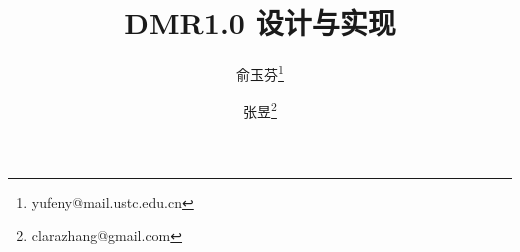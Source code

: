 \documentclass[a4paper,11pt,titlepage]{article}
\begin{document}
\title{DMR1.0 设计与实现} 
\author{俞玉芬\thanks{yufeny@mail.ustc.edu.cn}}
\author{张昱\thanks{clarazhang@gmail.com}}


\maketitle
\tableofcontents
\setcounter{tocdepth}{3}
\newpage
{}

 





\begin{small}


\end{small}
\end{document}

